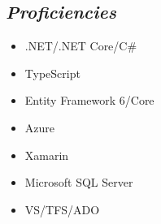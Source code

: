 \documentclass{res}
\begin{document}
{\begin{resume}
\section{\sl  Proficiencies}
\begin{itemize}
  \item .NET/.NET Core/C\#
  \item TypeScript
  \item Entity Framework 6/Core
  \item Azure
  \item Xamarin
  \item Microsoft SQL Server
  \item VS/TFS/ADO
\end{itemize}

\end{resume}

\vfill} %
\end{document}

